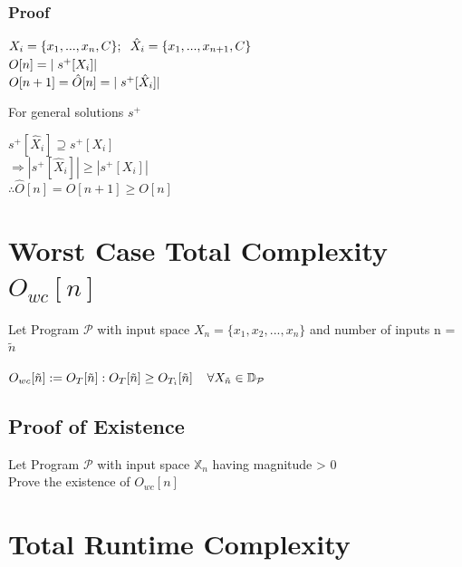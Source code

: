 \documentclass[11pt]{article}
\begin{document}
\subsubsection{Proof}
\begin{center}
$
X_i = \{x_1,...,x_n,C\}; \hspace{2mm} \hat{X}_i = \{x_1,...,x_{n+1},C\}
$
\\ \vspace{4mm}
$
O[n] = |\hspace{1mm} s^+[X_i]|
$
\\ \vspace{2mm}
$
O[n+1] = \hat{O}[n] = |\hspace{1mm} s^+[\hat{X}_i]|
$
\end{center}
\hspace{4mm}
For general solutions $s^+$
\begin{center}
$
s^+[\hat{X}_i] \supseteq s^+[X_i] 
$
\\ \vspace{2mm}
$
\Rightarrow |s^+[\hat{X}_i]| \geq |s^+[X_i]|
$
\\ \vspace{2mm}
$
\therefore \hat{O}[n] = O[n+1] \geq O[n]
$
\end{center}




\section{Worst Case Total Complexity $O_{wc}[n]$}
Let Program $\mathcal{P}$ with input space $X_n = \{x_1,x_2,...,x_n\}$ and number of inputs n = $\tilde{n}$
\begin{center}
$
O_{wc}[\tilde{n}] := O_T[\tilde{n}] : O_T[\tilde{n}] \geq O_{T_i}[\tilde{n}] \hspace{4mm} \forall X_{\tilde{n}} \in \mathbb{D}_\mathcal{P}
$
\end{center}

\subsection{Proof of Existence}
Let Program $\mathcal{P}$ with input space $\mathbb{X}_n$ having magnitude > 0\\
Prove the existence of $O_{wc}[n]$


\section{Total Runtime Complexity}
\end{document}
